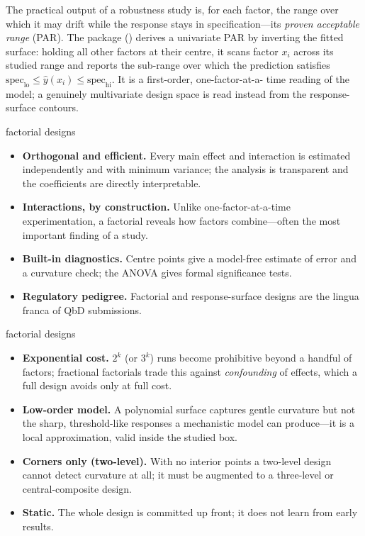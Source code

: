 The practical output of a robustness study is, for each factor, the range over
which it may drift while the response stays in specification---its \emph{proven
acceptable range} (PAR). The package () derives
a univariate PAR by inverting the fitted surface: holding all other factors at
their centre, it scans factor $x_i$ across its studied range and reports the
sub-range over which the prediction satisfies $\mathrm{spec}_{\mathrm{lo}} \le
\hat y(x_i) \le \mathrm{spec}_{\mathrm{hi}}$. It is a first-order, one-factor-at-a-
time reading of the model; a genuinely multivariate design space is read instead
from the response-surface contours.

\begin{prosbox}{factorial designs}
\begin{itemize}
  \item \textbf{Orthogonal and efficient.} Every main effect and interaction is
  estimated independently and with minimum variance; the analysis is transparent
  and the coefficients are directly interpretable.
  \item \textbf{Interactions, by construction.} Unlike one-factor-at-a-time
  experimentation, a factorial reveals how factors combine---often the most
  important finding of a study.
  \item \textbf{Built-in diagnostics.} Centre points give a model-free estimate
  of error and a curvature check; the ANOVA gives formal significance tests.
  \item \textbf{Regulatory pedigree.} Factorial and response-surface designs are
  the lingua franca of QbD submissions.
\end{itemize}
\end{prosbox}

\begin{consbox}{factorial designs}
\begin{itemize}
  \item \textbf{Exponential cost.} $2^k$ (or $3^k$) runs become prohibitive
  beyond a handful of factors; fractional factorials trade this against
  \emph{confounding} of effects, which a full design avoids only at full cost.
  \item \textbf{Low-order model.} A polynomial surface captures gentle curvature
  but not the sharp, threshold-like responses a mechanistic model can
  produce---it is a local approximation, valid inside the studied box.
  \item \textbf{Corners only (two-level).} With no interior points a two-level
  design cannot detect curvature at all; it must be augmented to a three-level or
  central-composite design.
  \item \textbf{Static.} The whole design is committed up front; it does not
  learn from early results.
\end{itemize}
\end{consbox}

